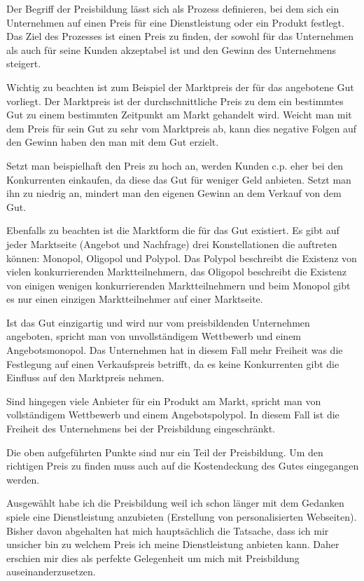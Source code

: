 \begin{refsection}
  
  Der Begriff der Preisbildung lässt sich als Prozess definieren, bei dem sich ein Unternehmen auf einen Preis für eine Dienstleistung oder ein Produkt festlegt. Das Ziel des Prozesses ist einen Preis zu finden, der sowohl für das Unternehmen als auch für seine Kunden akzeptabel ist und den Gewinn des Unternehmens steigert. 

  Wichtig zu beachten ist zum Beispiel der Marktpreis der für das angebotene Gut vorliegt. Der Marktpreis ist der durchschnittliche Preis zu dem ein bestimmtes Gut zu einem bestimmten Zeitpunkt am Markt gehandelt wird. Weicht man mit dem Preis für sein Gut zu sehr vom Marktpreis ab, kann dies negative Folgen auf den Gewinn haben den man mit dem Gut erzielt. \autocite[142]{Schinnerl2021}

  Setzt man beispielhaft den Preis zu hoch an, werden Kunden c.p. eher bei den Konkurrenten einkaufen, da diese das Gut für weniger Geld anbieten. Setzt man ihn zu niedrig an, mindert man den eigenen Gewinn an dem Verkauf von dem Gut.

  Ebenfalls zu beachten ist die Marktform die für das Gut existiert. Es gibt auf jeder Marktseite (Angebot und Nachfrage) drei Konstellationen die auftreten können: Monopol, Oligopol und Polypol. Das Polypol beschreibt die Existenz von vielen konkurrierenden Marktteilnehmern, das Oligopol beschreibt die Existenz von einigen wenigen konkurrierenden Marktteilnehmern und beim Monopol gibt es nur einen einzigen Marktteilnehmer auf einer Marktseite.

  Ist das Gut einzigartig und wird nur vom preisbildenden Unternehmen angeboten, spricht man von unvollständigem Wettbewerb und einem Angebotsmonopol. Das Unternehmen hat in diesem Fall mehr Freiheit was die Festlegung auf einen Verkaufspreis betrifft, da es keine Konkurrenten gibt die Einfluss auf den Marktpreis nehmen.

  Sind hingegen viele Anbieter für ein Produkt am Markt, spricht man von vollständigem Wettbewerb und einem Angebotspolypol. In diesem Fall ist die Freiheit des Unternehmens bei der Preisbildung eingeschränkt.

  Die oben aufgeführten Punkte sind nur ein Teil der Preisbildung. Um den richtigen Preis zu finden muss auch auf die Kostendeckung des Gutes eingegangen werden.

  Ausgewählt habe ich die Preisbildung weil ich schon länger mit dem Gedanken spiele eine Dienstleistung anzubieten (Erstellung von personalisierten Webseiten). Bisher davon abgehalten hat mich hauptsächlich die Tatsache, dass ich mir unsicher bin zu welchem Preis ich meine Dienstleistung anbieten kann. Daher erschien mir dies als perfekte Gelegenheit um mich mit Preisbildung auseinanderzusetzen.
  \clearpage
  \printbibliography[heading=subsubbibliography]
\end{refsection}
\clearpage
